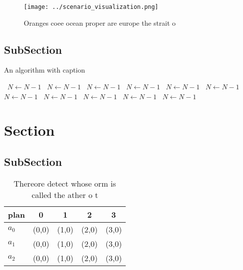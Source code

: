 \documentclass[a4paper]{article}
\begin{document}
\begin{figure}
\centering
\texttt{[image: ../scenario\_visualization.png]}
\caption{Oranges coee ocean proper are europe the strait o
}
\end{figure}
 
\subsection{SubSection}

\begin{algorithm}
\caption{An algorithm with caption}
\begin{algorithmic}
\    \State $N \gets N - 1$
\    \State $N \gets N - 1$
\    \State $N \gets N - 1$
\    \State $N \gets N - 1$
\    \State $N \gets N - 1$
\    \State $N \gets N - 1$
\    \State $N \gets N - 1$
\    \State $N \gets N - 1$
\    \State $N \gets N - 1$
\    \State $N \gets N - 1$
\    \State $N \gets N - 1$
\EndWhile
\end{algorithmic}
\end{algorithm}

\section{Section}

\subsection{SubSection}

\begin{table}
\begin{adjustbox}{width=0.6\columnwidth}
\begin{tabular}{|l|l|l|l|l|}
\hline
\textbf{plan} & \multicolumn{1}{c|}{\textbf{0}} & \multicolumn{1}{c|}{\textbf{1}} & \multicolumn{1}{c|}{\textbf{2}} & \multicolumn{1}{c|}{\textbf{3}} \\ \hline
\textbf{$a_0$}  & (0,0) & (1,0) & (2,0) & (3,0) \\ \hline
\textbf{$a_1$}  & (0,0) & (1,0) & (2,0) & (3,0) \\ \hline
\textbf{$a_2$}  & (0,0) & (1,0) & (2,0) & (3,0) \\ \hline
\end{tabular}
\end{adjustbox}
\caption{Thereore detect whose orm is called the ather o t
}
\end{table}
\end{document}
